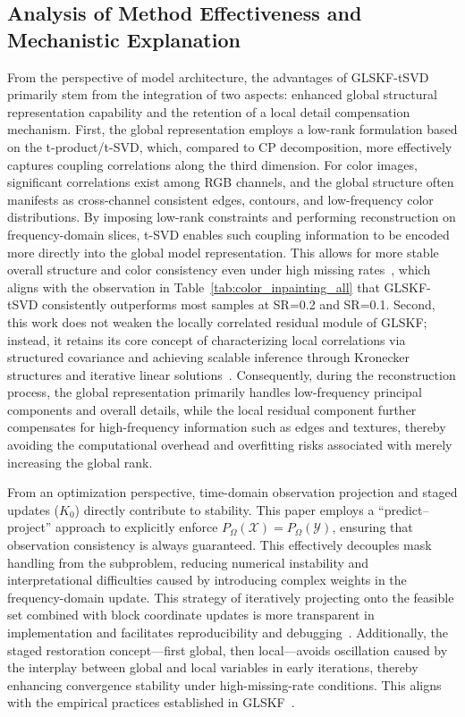 \documentclass[a4paper,12pt]{article}
\numberwithin{equation}{section}
\numberwithin{algorithm}{section}
\theoremstyle{remark}
\theoremstyle{definition}
\begin{document}
\subsection{Analysis of Method Effectiveness and Mechanistic Explanation}  
From the perspective of model architecture, the advantages of GLSKF-tSVD primarily stem from the integration of two aspects: enhanced global structural representation capability and the retention of a local detail compensation mechanism. First, the global representation employs a low-rank formulation based on the t-product/t-SVD, which, compared to CP decomposition, more effectively captures coupling correlations along the third dimension. For color images, significant correlations exist among RGB channels, and the global structure often manifests as cross-channel consistent edges, contours, and low-frequency color distributions. By imposing low-rank constraints and performing reconstruction on frequency-domain slices, t-SVD enables such coupling information to be encoded more directly into the global model representation. This allows for more stable overall structure and color consistency even under high missing rates~\cite{zhang2017tsvd}, which aligns with the observation in Table~\ref{tab:color_inpainting_all} that GLSKF-tSVD consistently outperforms most samples at SR=0.2 and SR=0.1. Second, this work does not weaken the locally correlated residual module of GLSKF; instead, it retains its core concept of characterizing local correlations via structured covariance and achieving scalable inference through Kronecker structures and iterative linear solutions~\cite{lei2024glskf}. Consequently, during the reconstruction process, the global representation primarily handles low-frequency principal components and overall details, while the local residual component further compensates for high-frequency information such as edges and textures, thereby avoiding the computational overhead and overfitting risks associated with merely increasing the global rank.

From an optimization perspective, time-domain observation projection and staged updates ($K_0$) directly contribute to stability. This paper employs a “predict–project” approach to explicitly enforce $P_{\Omega}(\mathcal{X}) = P_{\Omega}(\mathcal{Y})$, ensuring that observation consistency is always guaranteed. This effectively decouples mask handling from the subproblem, reducing numerical instability and interpretational difficulties caused by introducing complex weights in the frequency-domain update. This strategy of iteratively projecting onto the feasible set combined with block coordinate updates is more transparent in implementation and facilitates reproducibility and debugging~\cite{lei2024glskf}. Additionally, the staged restoration concept—first global, then local—avoids oscillation caused by the interplay between global and local variables in early iterations, thereby enhancing convergence stability under high-missing-rate conditions. This aligns with the empirical practices established in GLSKF~\cite{lei2024glskf}.
\end{document}
